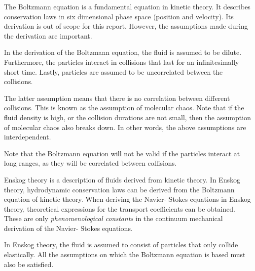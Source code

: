 The Boltzmann equation is a fundamental equation
in kinetic theory. It describes conservation 
laws in six dimensional phase space (position 
and velocity). Its derivation is out of scope 
for this report. However, the assumptions made 
during the derivation are important. 

In the derivation of the Boltzmann equation, the 
fluid is assumed to be dilute. Furthermore, the 
particles interact in collisions that last for 
an infinitesimally short time. Lastly, particles 
are assumed to be uncorrelated between the collisions.

The latter assumption means that there is 
no correlation between different collisions. 
This is known as the assumption of molecular 
chaos. Note that if the fluid density is high, 
or the collision durations are not small, then 
the assumption of molecular chaos also breaks 
down. In other words, the above assumptions 
are interdependent.

Note that the Boltzmann equation will not be 
valid if the particles interact at long ranges, 
as they will be correlated between collisions.



Enskog theory is a description of fluids derived 
from kinetic theory. In Enskog theory, hydrodynamic
conservation laws can be derived from the Boltzmann
equation of kinetic theory. When deriving the Navier-
Stokes equations in Enskog theory, theoretical 
expressions for the transport coefficients can 
be obtained. These are only \emph{phenomenological 
constants} in the continuum mechanical derivation 
of the Navier- Stokes equations.

In Enskog theory, the fluid is assumed to consist 
of particles that only collide elastically. All 
the assumptions on which the Boltzmann equation
is based must also be satisfied.






